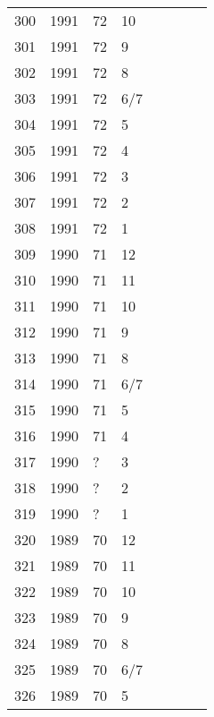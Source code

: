 \begin{longtable}{ |l|l|l|l|l|l|l|l| }
300 & 1991 & 72 &    10 &         &                &  & \\
301 & 1991 & 72 &     9 &         &                &  & \\
302 & 1991 & 72 &     8 &         &                &  & \\
303 & 1991 & 72 &   6/7 &         &                &  & \\
304 & 1991 & 72 &     5 &         &                &  & \\
305 & 1991 & 72 &     4 &         &                &  & \\
306 & 1991 & 72 &     3 &         &                &  & \\
307 & 1991 & 72 &     2 &         &                &  & \\
308 & 1991 & 72 &     1 &         &                &  & \\
309 & 1990 & 71 &    12 &         &                &  & \\
310 & 1990 & 71 &    11 &         &                &  & \\
311 & 1990 & 71 &    10 &         &                &  & \\
312 & 1990 & 71 &     9 &         &                &  & \\
313 & 1990 & 71 &     8 &         &                &  & \\
314 & 1990 & 71 &   6/7 &         &                &  & \\
315 & 1990 & 71 &     5 &         &                &   & \\
316 & 1990 & 71 &     4 &         &                &  & \\
317 & 1990 & ?  &     3 &         &                &  & \\
318 & 1990 & ?  &     2 &         &                &  & \\
319 & 1990 & ?  &     1 &         &                &  & \\
320 & 1989 & 70 &    12 &         &                &   & \\
321 & 1989 & 70 &    11 &         &                &  & \\
322 & 1989 & 70 &    10 &         &                &  & \\
323 & 1989 & 70 &     9 &         &                &  & \\
324 & 1989 & 70 &     8 &         &                &  & \\
325 & 1989 & 70 &   6/7 &         &                &  & \\
326 & 1989 & 70 &     5 &         &                &  & \\

\end{longtable}
